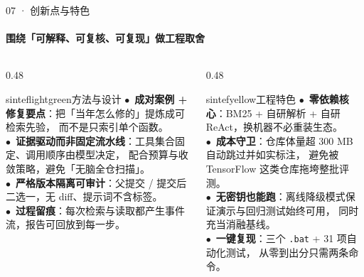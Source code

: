 \documentclass{beamer}
\newcommand{\good}{\textcolor{sintefgreen}{$\bullet$}}
\begin{document}
\begin{frame}{07 · 创新点与特色}
\framesubtitle{围绕「可解释、可复核、可复现」做工程取舍}
\footnotesize
\begin{columns}[t]
\begin{column}{0.48\textwidth}
\begin{colorblock}[black]{sinteflightgreen}{方法与设计}
\scriptsize
\good\ \textbf{成对案例 + 修复要点}：把「当年怎么修的」提炼成可检索先验，
而不是只索引单个函数。\\[0.25em]
\good\ \textbf{证据驱动而非固定流水线}：工具集合固定、调用顺序由模型决定，
配合预算与收敛策略，避免「无脑全仓扫描」。\\[0.25em]
\good\ \textbf{严格版本隔离可审计}：父提交 / 提交后二选一，无 diff、提示词不含标签。\\[0.25em]
\good\ \textbf{过程留痕}：每次检索与读取都产生事件流，报告可回放到每一步。
\end{colorblock}
\end{column}
\begin{column}{0.48\textwidth}
\begin{colorblock}[black]{sintefyellow}{工程特色}
\scriptsize
\good\ \textbf{零依赖核心}：BM25 + 自研解析 + 自研 ReAct，换机器不必重装生态。\\[0.25em]
\good\ \textbf{成本守卫}：仓库体量超 300 MB 自动跳过并如实标注，
避免被 TensorFlow 这类仓库拖垮整批评测。\\[0.25em]
\good\ \textbf{无密钥也能跑}：离线降级模式保证演示与回归测试始终可用，
同时充当消融基线。\\[0.25em]
\good\ \textbf{一键复现}：三个 \texttt{.bat} + 31 项自动化测试，
从零到出分只需两条命令。
\end{colorblock}
\end{column}
\end{columns}
\end{frame}
\end{document}

